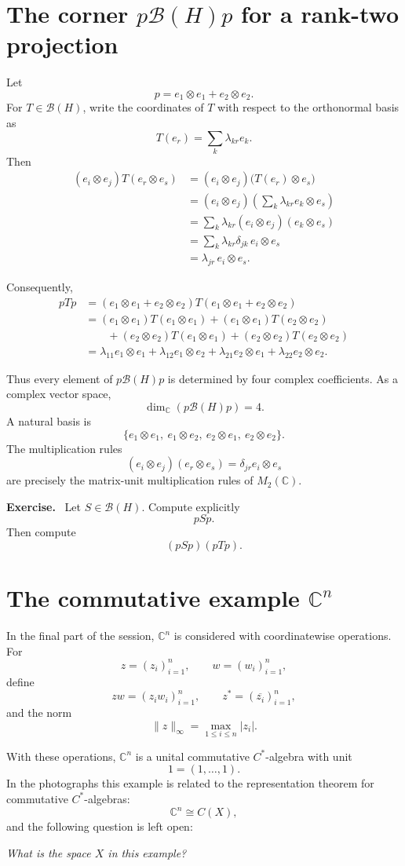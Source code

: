 \documentclass[11pt]{article}
\newcommand{\C}{\mathbb{C}}
\newcommand{\BH}{\mathcal{B}(H)}
\newenvironment{exercise}{\par\medskip\noindent\textbf{Exercise.}\ }{\par\medskip}
\begin{document}
\section{The corner $p\mathcal{B}(H)p$ for a rank-two projection}

Let
\[
p=e_1\otimes e_1+e_2\otimes e_2.
\]
For $T\in\BH$, write the coordinates of $T$ with respect to the orthonormal basis as
\[
T(e_r)=\sum_k\lambda_{kr}e_k.
\]
Then
\begin{align*}
(e_i\otimes e_j)T(e_r\otimes e_s)
 &= (e_i\otimes e_j)\bigl(T(e_r)\otimes e_s\bigr)\\
 &= (e_i\otimes e_j)
    \left(\sum_k\lambda_{kr}e_k\otimes e_s\right)\\
 &=\sum_k\lambda_{kr}(e_i\otimes e_j)(e_k\otimes e_s)\\
 &=\sum_k\lambda_{kr}\delta_{jk}\,e_i\otimes e_s\\
 &=\lambda_{jr}\,e_i\otimes e_s.
\end{align*}

Consequently,
\begin{align*}
pTp
 &= (e_1\otimes e_1+e_2\otimes e_2)
    T
    (e_1\otimes e_1+e_2\otimes e_2)\\
 &= (e_1\otimes e_1)T(e_1\otimes e_1)
  +(e_1\otimes e_1)T(e_2\otimes e_2)\\
 &\qquad
  +(e_2\otimes e_2)T(e_1\otimes e_1)
  +(e_2\otimes e_2)T(e_2\otimes e_2)\\
 &=\lambda_{11}e_1\otimes e_1
  +\lambda_{12}e_1\otimes e_2
  +\lambda_{21}e_2\otimes e_1
  +\lambda_{22}e_2\otimes e_2.
\end{align*}

Thus every element of $p\BH p$ is determined by four complex coefficients. As a
complex vector space,
\[
\dim_{\C}(p\BH p)=4.
\]
A natural basis is
\[
\{e_1\otimes e_1,\ e_1\otimes e_2,\ e_2\otimes e_1,\ e_2\otimes e_2\}.
\]
The multiplication rules
\[
(e_i\otimes e_j)(e_r\otimes e_s)=\delta_{jr}e_i\otimes e_s
\]
are precisely the matrix-unit multiplication rules of $M_2(\C)$.

\begin{exercise}
Let $S\in\BH$. Compute explicitly
\[
pSp.
\]
Then compute
\[
(pSp)(pTp).
\]
\end{exercise}

\section{The commutative example $\C^n$}

In the final part of the session, $\C^n$ is considered with coordinatewise
operations. For
\[
z=(z_i)_{i=1}^n,
\qquad
w=(w_i)_{i=1}^n,
\]
define
\[
zw=(z_iw_i)_{i=1}^n,
\qquad
z^*=(\overline{z_i})_{i=1}^n,
\]
and the norm
\[
\|z\|_\infty=\max_{1\le i\le n}|z_i|.
\]

With these operations, $\C^n$ is a unital commutative $C^*$-algebra with unit
\[
1=(1,\ldots,1).
\]
In the photographs this example is related to the representation theorem for
commutative $C^*$-algebras:
\[
\C^n\cong C(X),
\]
and the following question is left open:
\begin{center}
\emph{What is the space $X$ in this example?}
\end{center}
\end{document}
